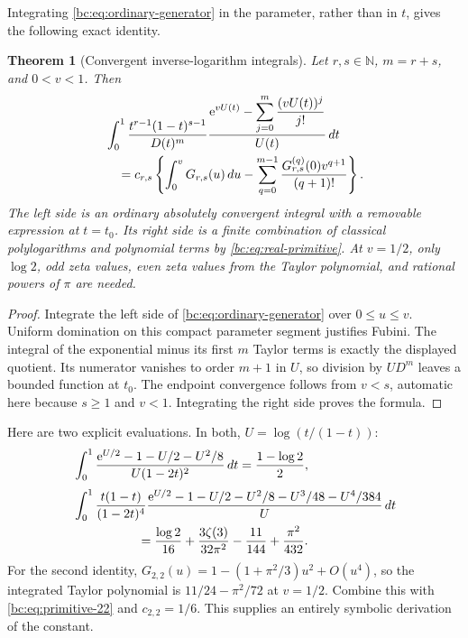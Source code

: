 \documentclass[11pt,letterpaper]{article}
\numberwithin{equation}{section}
\newtheorem{theorem}{Theorem}[section]
\theoremstyle{definition}
\theoremstyle{remark}
\newcommand{\bcN}{\mathbb N}
\newcommand{\bce}{\mathrm e}
\begin{document}
Integrating \eqref{bc:eq:ordinary-generator} in the parameter, rather than
in $t$, gives the following exact identity.

\begin{theorem}[Convergent inverse-logarithm integrals]
\label{bc:thm:inverse-log}
Let $r,s\in\bcN$, $m=r+s$, and $0<v<1$. Then
\begin{align}
 &\int_0^1\frac{t^{r-1}(1-t)^{s-1}}{D(t)^m}
 \frac{\displaystyle\bce^{vU(t)}
              -\sum_{j=0}^{m}\frac{(vU(t))^j}{j!}}{U(t)}\,dt\notag\\
 &\quad=c_{r,s}\left\{\int_0^vG_{r,s}(u)\,du
       -\sum_{q=0}^{m-1}
          \frac{G_{r,s}^{(q)}(0)v^{q+1}}{(q+1)!}\right\}.
 \label{bc:eq:inverse-log}
\end{align}
The left side is an ordinary absolutely convergent integral with a
removable expression at $t=t_0$. Its right side is a finite combination
of classical polylogarithms and polynomial terms by
\eqref{bc:eq:real-primitive}. At $v=1/2$, only $\log2$, odd zeta values,
even zeta values from the Taylor polynomial, and rational powers of
$\pi$ are needed.
\end{theorem}
\begin{proof}
Integrate the left side of \eqref{bc:eq:ordinary-generator} over
$0\le u\le v$. Uniform domination on this compact parameter segment
justifies Fubini. The integral of the exponential minus its first $m$
Taylor terms is exactly the displayed quotient. Its numerator vanishes
to order $m+1$ in $U$, so division by $U D^m$ leaves a bounded function
at $t_0$. The endpoint convergence follows from $v<s$, automatic here
because $s\ge1$ and $v<1$. Integrating the right side proves the formula.
\end{proof}

Here are two explicit evaluations. In both, $U=\log(t/(1-t))$:
\begin{align}
 &\int_0^1\frac{\bce^{U/2}-1-U/2-U^2/8}{U(1-2t)^2}\,dt
             =\frac{1-\log2}{2},
 \label{bc:eq:inverse-11}\\[3pt]
 &\int_0^1\frac{t(1-t)}{(1-2t)^4}
  \frac{\bce^{U/2}-1-U/2-U^2/8-U^3/48-U^4/384}{U}\,dt\notag\\
 &\hspace{18mm}=
  \frac{\log2}{16}+\frac{3\zeta(3)}{32\pi^2}
                   -\frac{11}{144}+\frac{\pi^2}{432}.
 \label{bc:eq:inverse-22}
\end{align}
For the second identity,
$G_{2,2}(u)=1-(1+\pi^2/3)u^2+O(u^4)$, so the integrated Taylor
polynomial is $11/24-\pi^2/72$ at $v=1/2$. Combine this with
\eqref{bc:eq:primitive-22} and $c_{2,2}=1/6$. This supplies an entirely
symbolic derivation of the constant.
\end{document}
